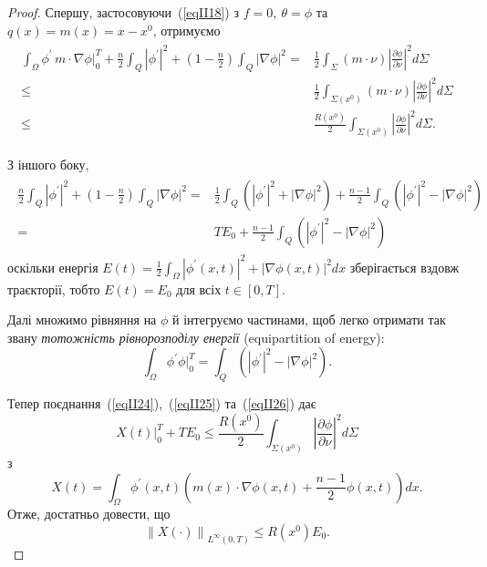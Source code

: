 \begin{proof}
\label{proof:II.remark.2.6}
Спершу, застосовуючи~(\ref{eqII18}) з $f = 0,\ \theta = \phi$ та $q(x) = m(x) = x - x^0$, отримуємо
\begin{align}\label{eqII24}
\begin{split}
    \int_\Omega \phi^\prime\, m \cdot \nabla\phi \bigg|_0^T + \frac{n}{2} \int_Q \left| \phi^\prime \right|^2 + \left( 1 - \frac{n}{2} \right) \int_Q \left| \nabla \phi \right|^2
    = & \frac{1}{2} \int_\Sigma (m \cdot \nu)
    \left| \frac{\partial \phi}{ \partial \nu} \right|^2 d\Sigma
    \\ \leq & \frac{1}{2} \int_{\Sigma(x^0)} (m \cdot \nu) \left| \frac{\partial \phi}{ \partial \nu} \right|^2 d\Sigma
    \\ \leq & \frac{R(x^0)}{2} \int_{\Sigma(x^0)} \left| \frac{\partial \phi}{ \partial \nu} \right|^2 d\Sigma.
\end{split}
\end{align}

З іншого боку,
\begin{align}\label{eqII25}
\begin{split}
\frac{n}{2} \int_Q \left| \phi^\prime \right|^2 + \left( 1 - \frac{n}{2} \right) \int_Q \left| \nabla \phi \right|^2 = & \frac{1}{2} \int_Q (\left| \phi^\prime \right|^2 + \left| \nabla \phi \right|^2 ) + \frac{n-1}{2} \int_Q (\left| \phi^\prime \right|^2 - \left| \nabla \phi \right|^2 )
\\ =& TE_0 + \frac{n-1}{2} \int_Q (\left| \phi^\prime \right|^2 - \left| \nabla \phi \right|^2 )
\end{split}
\end{align}
оскільки енергія
$
E(t) = \frac{1}{2} \int_\Omega \left|\phi^\prime(x, t)\right|^2 + \left|\nabla \phi(x,t)\right|^2 dx
$
зберігається вздовж траєкторії, тобто
$
E(t) = E_0
$
для всіх $t \in [0, T]$.

Далі множимо рівняння на $\phi$ й інтегруємо частинами, щоб легко отримати так звану \emph{тотожність рівнорозподілу енергії} (equipartition of energy):
\begin{equation} \label{eqII26}
\int_\Omega \phi^\prime \phi \Big|_0^T = \int_Q (\left| \phi^\prime \right|^2 - \left| \nabla \phi \right|^2 ).
\end{equation}

Тепер поєднання~(\ref{eqII24}),~(\ref{eqII25}) та~(\ref{eqII26}) дає
\begin{equation} \label{eqII27}
X(t) \Big|_0^T + T E_0 \leq \frac{R(x^0)}{2} \int_{\Sigma(x^0)} \left| \frac{ \partial \phi}{ \partial \nu} \right|^2 d\Sigma
\end{equation}
з
\begin{equation} \label{eqII28}
X(t) = \int_\Omega \phi^\prime(x,t) \left(m(x) \cdot \nabla \phi(x,t) + \frac{n-1}{2} \phi(x,t)\right) dx.
\end{equation}
Отже, достатньо довести, що
\begin{equation} \label{eqII29}
\left\| X(\cdot) \right\|_{L^\infty(0,T)} \leq R(x^0) E_0.
\end{equation}


\end{proof}
